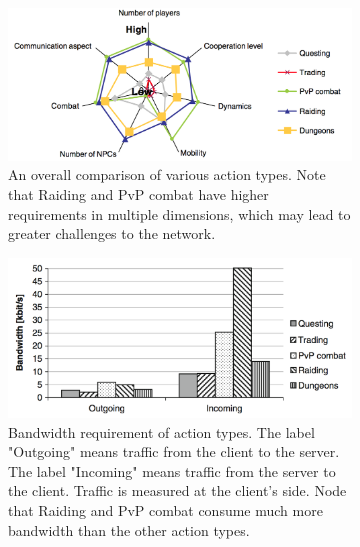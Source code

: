 \documentclass{article}
\begin{document}
\begin{figure}
\begin{center}
\begin{subfigure}[b]{\textwidth}
	\begin{center}
	\includegraphics[scale=0.3]{images/actstar.png}
	\caption{An overall comparison of various action types. Note that Raiding and PvP combat have higher requirements in multiple dimensions, which may lead to greater challenges to the network.}
	\label{actstar}
	\end{center}
\end{subfigure}
\begin{subfigure}[b]{\textwidth}
	\begin{center}
	\includegraphics[scale=0.25]{images/actbw.png}
	\caption{Bandwidth requirement of action types. The label "Outgoing" means traffic from the client to the server. The label "Incoming" means traffic from the server to the client. Traffic is measured at the client's side. Node that Raiding and PvP combat consume much more bandwidth than the other action types.}
	\label{actbw}
	\end{center}
\end{subfigure}
\begin{subfigure}[b]{\textwidth}
	\begin{center}

\end{center}
\end{subfigure}
\end{center}
\end{figure}
\end{document}
